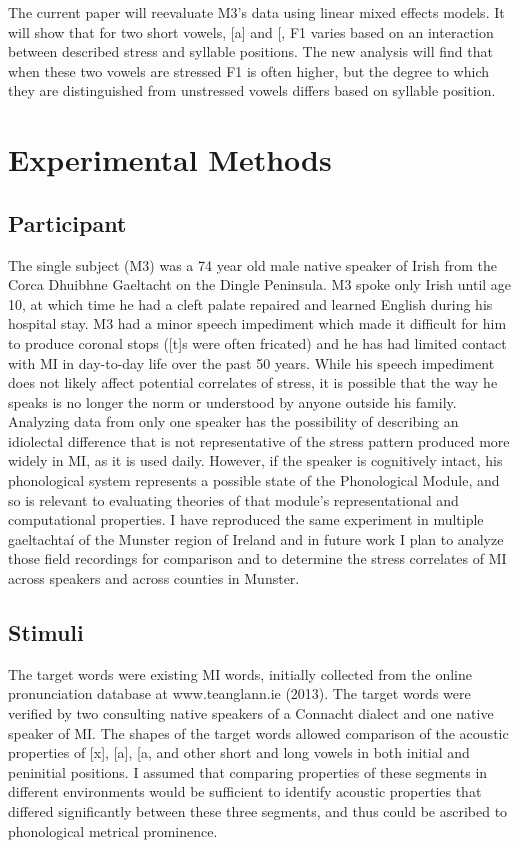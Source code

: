 \documentclass[floatsintext,man]{apa6}
\theoremstyle{definition}
\theoremstyle{definition}
\theoremstyle{definition}
\theoremstyle{remark}
\begin{document}
The current paper will reevaluate M3's data using linear mixed effects
models. It will show that for two short vowels, {[}a{]} and
{[}\textipa{@}{]}, F1 varies based on an interaction between described
stress and syllable positions. The new analysis will find that when
these two vowels are stressed F1 is often higher, but the degree to
which they are distinguished from unstressed vowels differs based on
syllable position.

\section{Experimental Methods}\label{experimental-methods}

\subsection{Participant}\label{participant}

The single subject (M3) was a 74 year old male native speaker of Irish
from the Corca Dhuibhne Gaeltacht on the Dingle Peninsula. M3 spoke only
Irish until age 10, at which time he had a cleft palate repaired and
learned English during his hospital stay. M3 had a minor speech
impediment which made it difficult for him to produce coronal stops
({[}t{]}s were often fricated) and he has had limited contact with MI in
day-to-day life over the past 50 years. While his speech impediment does
not likely affect potential correlates of stress, it is possible that
the way he speaks is no longer the norm or understood by anyone outside
his family. Analyzing data from only one speaker has the possibility of
describing an idiolectal difference that is not representative of the
stress pattern produced more widely in MI, as it is used daily. However,
if the speaker is cognitively intact, his phonological system represents
a possible state of the Phonological Module, and so is relevant to
evaluating theories of that module's representational and computational
properties. I have reproduced the same experiment in multiple
gaeltachtaí of the Munster region of Ireland and in future work I plan
to analyze those field recordings for comparison and to determine the
stress correlates of MI across speakers and across counties in Munster.

\subsection{Stimuli}\label{stimuli}

The target words were existing MI words, initially collected from the
online pronunciation database at www.teanglann.ie (2013). The target
words were verified by two consulting native speakers of a Connacht
dialect and one native speaker of MI. The shapes of the target words
allowed comparison of the acoustic properties of {[}x{]}, {[}a{]},
{[}a\textipa{:}{]}, and other short and long vowels in both initial and
peninitial positions. I assumed that comparing properties of these
segments in different environments would be sufficient to identify
acoustic properties that differed significantly between these three
segments, and thus could be ascribed to phonological metrical
prominence.
\end{document}
